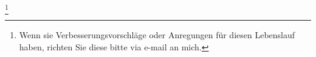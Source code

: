 \documentclass[11pt,a4paper,sans]{moderncv}        %
\newcommand\blfootnote[1]{%
  \begingroup
  \renewcommand\thefootnote{}\footnote{#1}%
  \addtocounter{footnote}{-1}%
  \endgroup
}
\renewcommand*{\bibliographyitemlabel}{[\arabic{enumiv}]}
\begin{document}

\blfootnote{Wenn sie Verbesserungsvorschläge oder Anregungen für diesen Lebenslauf haben, richten Sie diese bitte via e-mail an mich.}

\clearpage
\end{document}

